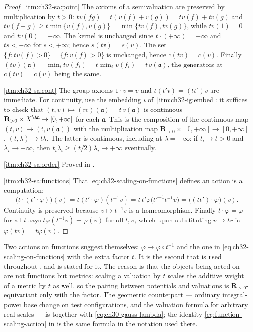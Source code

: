 \begin{proof}
\cref{itm:ch32-sa:point}  The axioms of a semivaluation are preserved by
multiplication by $t>0$: $tv(fg)=t(v(f)+v(g))=tv(f)+tv(g)$ and
$tv(f+g)\geq t\min\{v(f),v(g)\}=\min\{tv(f),tv(g)\}$, while
$tv(1)=0$ and $tv(0)=+\infty$.  The kernel is unchanged since
$t\cdot(+\infty)=+\infty$ and $ts<+\infty$ for $s<+\infty$; hence
$s(tv)=s(v)$.  The set $\{f:tv(f)>0\}=\{f:v(f)>0\}$ is unchanged, hence
$c(tv)=c(v)$.  Finally
$(tv)(\mathfrak a)=\min_i tv(f_i)=t\min_iv(f_i)=t\,v(\mathfrak a)$, the
generators at $c(tv)=c(v)$ being the same.

\cref{itm:ch32-sa:cont}  The group axioms $1\cdot v=v$ and
$t(t'v)=(tt')v$ are immediate.  For continuity, use the embedding
$\iota$ of \,\cref{itm:ch32-ig:embed}: it
suffices to check that $(t,v)\mapsto(tv)(\mathfrak a)=t\,v(\mathfrak a)$ is
continuous $\mathbf R_{>0}\times X^{\An}\to[0,+\infty]$ for each
$\mathfrak a$.  This is the composition of the continuous map
$(t,v)\mapsto(t,v(\mathfrak a))$ with the multiplication map
$\mathbf R_{>0}\times[0,+\infty]\to[0,+\infty]$, $(t,\lambda)\mapsto
t\lambda$.  The latter is continuous, including at $\lambda=+\infty$:
if $t_i\to t>0$ and $\lambda_i\to+\infty$, then
$t_i\lambda_i\geq(t/2)\lambda_i\to+\infty$ eventually.

\cref{itm:ch32-sa:order}  Proved in .

\cref{itm:ch32-sa:functions}  That \eqref{eq:ch32-scaling-on-functions}
defines an action is a computation:
\[
 \bigl(t\cdot(t'\cdot\varphi)\bigr)(v)
 =t(t'\cdot\varphi)(t^{-1}v)
 =t\,t'\varphi\bigl(t'^{-1}t^{-1}v\bigr)
 =\bigl((tt')\cdot\varphi\bigr)(v).
\]
Continuity is preserved because $v\mapsto t^{-1}v$ is a homeomorphism.
Finally $t\cdot\varphi=\varphi$ for all $t$ says
$t\varphi(t^{-1}v)=\varphi(v)$ for all $t,v$, which upon substituting
$v\mapsto tv$ is $\varphi(tv)=t\varphi(v)$.
\end{proof}

\begin{remark}
\label{rem:ch32-scaling-factor}
Two actions on functions suggest themselves: $\varphi\mapsto
\varphi\circ t^{-1}$ and the one in \eqref{eq:ch32-scaling-on-functions}
with the extra factor $t$.  It is the second that is used throughout
, and  is stated for it.  The
reason is that the objects being acted on are not functions but metrics:
scaling a valuation by $t$ scales the additive weight of a metric by $t$
as well, so the pairing between potentials and valuations is
$\mathbf R_{>0}$-equivariant only with the factor.  The geometric
counterpart --- ordinary integral-power base change on test
configurations, and the valuation formula for arbitrary real scales --- is  together with
\eqref{eq:ch30-gauss-lambda}; the identity
\eqref{eq:function-scaling-action} in  is
the same formula in the notation used there.
\end{remark}

